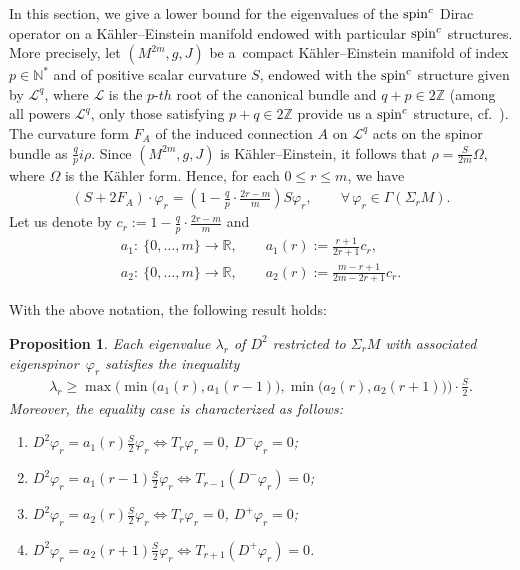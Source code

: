\documentclass[10pt,a4paper]{amsart}
\numberwithin{equation}{section}
\newtheorem{prop}[thm]{Proposition}
\theoremstyle{definition}
\begin{document}
In this section, we give a lower bound for the eigenvalues of the ${\mathop{\rm spin}^c}$ Dirac operator on a K\"ahler--Einstein manifold endowed with particular ${\mathop{\rm spin}^c}$ structures. More precisely, let $(M^{2m},g,J)$ be a~compact K\"ahler--Einstein manifold of index $p\in\mathbb{N}^*$ and of positive scalar curvature $S$, endowed with the ${\mathop{\rm spin}^c}$ structure given by $\mathcal{L}^q$, where $\mathcal L$ is the $p$-$th$ root of the canonical bundle and $q+p\in2\mathbb{Z}$ (among all powers $\mathcal L^q$,
only those satisfying $p+q \in 2\mathbb Z$ provide us a  ${\mathop{\rm spin}^c}$ structure,  cf.~\cite[Section~7]{hmu}). The curvature form $F_A$ of the induced connection $A$ on $\mathcal{L}^q$  acts on the spinor bundle as $\frac{q}{p}i\rho$. Since $(M^{2m},g,J)$ is K\"ahler--Einstein, it follows that $\rho=\frac{S}{2m}\Omega$, where $\Omega$ is the K\"ahler form. Hence,
for each $0\leq r\leq m$, we have
\begin{gather}\label{fa-ke}
(S +2 F_A )\cdot \varphi_r =\left(1-\frac{q}{p}\cdot\frac{2r-m}{m}\right) S \varphi_r, \qquad \forall\, \varphi_r\in\Gamma(\Sigma_{r}M).
\end{gather}
Let us denote by $c_r:=1-\frac{q}{p}\cdot \frac{2r-m}{m}$ and
\begin{gather*}
  a_1\colon \ \{0,\dots,m\} \to \mathbb{R}, \qquad   a_1(r):=\frac{r+1}{2r+1} c_r,\\ %
  a_2\colon \ \{0,\dots,m\} \to \mathbb{R},\qquad    a_2(r):=\frac{m-r+1}{2m-2r+1}c_r.%
\end{gather*}


With the above notation, the following result holds:
\begin{prop}\label{estimgen}
Each eigenvalue $\lambda_r$ of $D^2$ restricted to $\Sigma_{r}M$ with associated eigenspinor~$\varphi_r$ satisfies the inequality
\begin{gather}\label{ineggen}
\lambda_r\geq \max \big (\min \big (a_1(r), a_1(r-1)\big ), \min\big( a_2(r), a_2(r+1)\big)\big)\cdot \frac{S}{2}.
\end{gather}
Moreover, the equality case is characterized as follows:
\begin{enumerate}[$a)$]\itemsep=0pt
 \item $D^2\varphi_r=a_1(r)\frac{S}{2}\varphi_r \Longleftrightarrow T_r\varphi_r=0$, $D^-\varphi_r=0$;
 \item $D^2\varphi_r=a_1(r-1)\frac{S}{2}\varphi_r \Longleftrightarrow  T_{r-1}(D^-\varphi_r)=0$;
 \item $D^2\varphi_r=a_2(r)\frac{S}{2}\varphi_r \Longleftrightarrow T_r\varphi_r=0$, $D^+\varphi_r=0$;
 \item $D^2\varphi_r=a_2(r+1)\frac{S}{2}\varphi_r \Longleftrightarrow  T_{r+1}(D^+\varphi_r)=0$.
\end{enumerate}
\end{prop}
\end{document}
